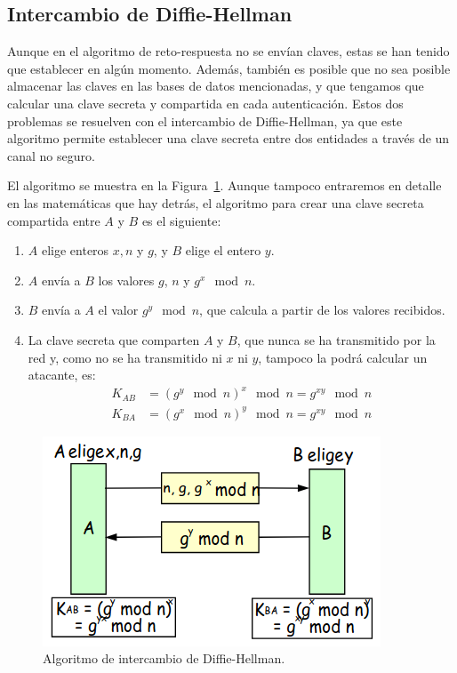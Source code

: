 \subsection{Intercambio de Diffie-Hellman}

Aunque en el algoritmo de reto-respuesta no se envían claves, estas se han tenido que establecer en algún momento.
Además, también es posible que no sea posible almacenar las claves en las bases de datos mencionadas, y que tengamos que calcular una clave secreta y compartida en cada autenticación. Estos dos problemas se resuelven con el intercambio de Diffie-Hellman, ya que este algoritmo permite establecer una clave secreta entre dos entidades a través de un canal no seguro.

El algoritmo se muestra en la Figura~\ref{fig:diffie-hellman}. Aunque tampoco entraremos en detalle en las matemáticas que hay detrás, el algoritmo para crear una clave secreta compartida entre $A$ y $B$ es el siguiente:
\begin{enumerate}
    \item $A$ elige enteros $x,n$ y $g$, y $B$ elige el entero $y$.
    \item $A$ envía a $B$ los valores $g$, $n$ y $g^x \mod n$.
    \item $B$ envía a $A$ el valor $g^y \mod n$, que calcula a partir de los valores recibidos.
    \item La clave secreta que comparten $A$ y $B$, que nunca se ha transmitido por la red y, como no se ha transmitido ni $x$ ni $y$, tampoco la podrá calcular un atacante, es:
    \begin{align*}
        K_{AB}  &= (g^y \mod n)^x \mod n = g^{xy} \mod n\\
        K_{BA}  &= (g^x \mod n)^y \mod n = g^{xy} \mod n
    \end{align*}
\end{enumerate}
\begin{figure}
    \centering
    \includegraphics[width=0.4\linewidth]{./images/diffie-hellman.png}
    \caption{Algoritmo de intercambio de Diffie-Hellman.}
    \label{fig:diffie-hellman}
\end{figure}

